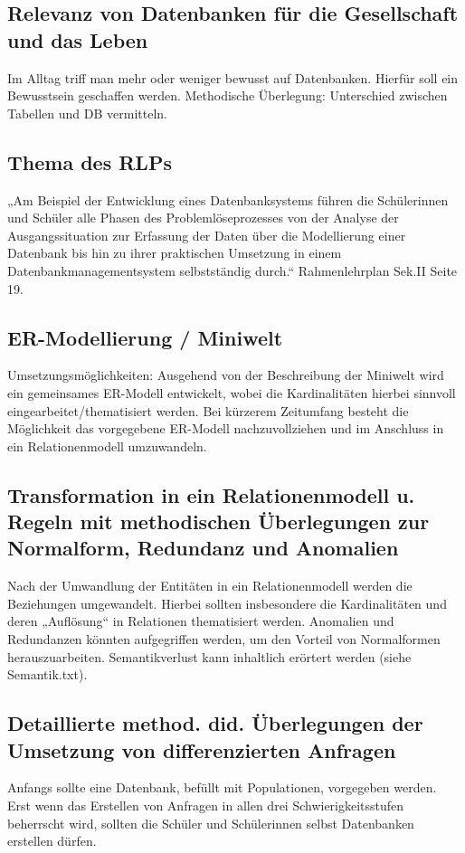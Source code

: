 \documentclass[fleqn]{scrartcl}
\begin{document}
\subsection{ Relevanz von Datenbanken für  die Gesellschaft und das Leben} 

Im Alltag triff man mehr oder weniger bewusst auf Datenbanken. Hierfür soll ein Bewusstsein geschaffen werden.  
Methodische Überlegung: Unterschied zwischen Tabellen und DB vermitteln.


\subsection{Thema des RLPs}

„Am Beispiel der Entwicklung eines Datenbanksystems führen die Schülerinnen und Schüler alle Phasen des Problemlöseprozesses von der Analyse der Ausgangssituation zur Erfassung der Daten über die Modellierung einer Datenbank bis hin zu ihrer praktischen Umsetzung in einem Datenbankmanagementsystem selbstständig durch.“
Rahmenlehrplan Sek.II Seite 19. 

\subsection{ER-Modellierung / Miniwelt} 
Umsetzungsmöglichkeiten: 
Ausgehend von der Beschreibung der Miniwelt wird ein gemeinsames ER-Modell entwickelt, wobei die Kardinalitäten hierbei sinnvoll eingearbeitet/thematisiert werden. 
Bei kürzerem Zeitumfang besteht die Möglichkeit das vorgegebene ER-Modell nachzuvollziehen und im Anschluss in ein Relationenmodell umzuwandeln. 

\subsection{Transformation in ein Relationenmodell u. Regeln mit methodischen Überlegungen zur Normalform, Redundanz und Anomalien}

Nach der Umwandlung der Entitäten in ein Relationenmodell werden die Beziehungen umgewandelt. Hierbei sollten insbesondere die Kardinalitäten und deren „Auflösung“ in Relationen thematisiert werden. Anomalien und Redundanzen könnten aufgegriffen werden, um den Vorteil von Normalformen herauszuarbeiten. 
Semantikverlust kann inhaltlich erörtert werden (siehe Semantik.txt).

\subsection{Detaillierte method. did. Überlegungen der Umsetzung von differenzierten Anfragen}
Anfangs sollte eine Datenbank, befüllt mit Populationen, vorgegeben werden. Erst wenn das Erstellen von Anfragen in allen drei Schwierigkeitsstufen beherrscht wird, sollten die Schüler und Schülerinnen selbst Datenbanken erstellen dürfen.
\end{document}
